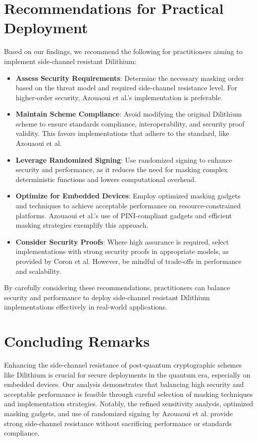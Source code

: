 \section{Recommendations for Practical Deployment}

Based on our findings, we recommend the following for practitioners aiming to implement side-channel resistant Dilithium:

\begin{itemize}
    \item \textbf{Assess Security Requirements}: Determine the necessary masking order based on the threat model and required side-channel resistance level. For higher-order security, Azouaoui et al.'s implementation is preferable.
    \item \textbf{Maintain Scheme Compliance}: Avoid modifying the original Dilithium scheme to ensure standards compliance, interoperability, and security proof validity. This favors implementations that adhere to the standard, like Azouaoui et al.
    \item \textbf{Leverage Randomized Signing}: Use randomized signing to enhance security and performance, as it reduces the need for masking complex deterministic functions and lowers computational overhead.
    \item \textbf{Optimize for Embedded Devices}: Employ optimized masking gadgets and techniques to achieve acceptable performance on resource-constrained platforms. Azouaoui et al.'s use of PINI-compliant gadgets and efficient masking strategies exemplify this approach.
    \item \textbf{Consider Security Proofs}: Where high assurance is required, select implementations with strong security proofs in appropriate models, as provided by Coron et al. However, be mindful of trade-offs in performance and scalability.
\end{itemize}

By carefully considering these recommendations, practitioners can balance security and performance to deploy side-channel resistant Dilithium implementations effectively in real-world applications.

\section{Concluding Remarks}

Enhancing the side-channel resistance of post-quantum cryptographic schemes like Dilithium is crucial for secure deployments in the quantum era, especially on embedded devices. Our analysis demonstrates that balancing high security and acceptable performance is feasible through careful selection of masking techniques and implementation strategies. Notably, the refined sensitivity analysis, optimized masking gadgets, and use of randomized signing by Azouaoui et al. provide strong side-channel resistance without sacrificing performance or standards compliance.


